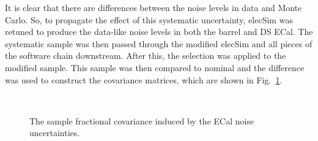 \newline
\newline
It is clear that there are differences between the noise levels in data and Monte Carlo.  So, to propagate the effect of this systematic uncertainty, elecSim was retuned to produce the data-like noise levels in both the barrel and DS ECal.  The systematic sample was then passed through the modified elecSim and all pieces of the software chain downstream.  After this, the selection was applied to the modified sample.  This sample was then compared to nominal and the difference was used to construct the covariance matrices, which are shown in Fig.~\ref{fig:ECalNoiseCovarianceMatrices}.
\begin{figure}%
  \centering
  \\
  \caption{The sample fractional covariance induced by the ECal noise uncertainties.}
  \label{fig:ECalNoiseCovarianceMatrices}
\end{figure}
